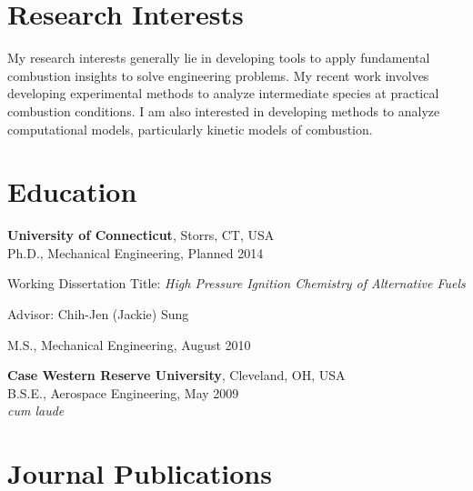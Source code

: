 \section{{\sectionfont Research Interests}}

My research interests generally lie in developing tools to apply fundamental
combustion insights to solve engineering problems. My recent work
involves developing experimental methods to analyze intermediate species
at practical combustion conditions. I am also interested in developing
methods to analyze computational models, particularly kinetic models of
combustion.

\section{{\sectionfont Education}}

\textbf{University of Connecticut}, Storrs, CT, USA\\
Ph.D., Mechanical Engineering, Planned 2014
        \begin{innerlist}
        \item[] Working Dissertation Title: \textit{High Pressure
                Ignition Chemistry of Alternative Fuels}
        \item[] Advisor: Chih-Jen (Jackie) Sung
        \end{innerlist}

\vspace{0.1in}
M.S., Mechanical Engineering, August 2010

\vspace{0.2in}

\textbf{Case Western Reserve University}, Cleveland, OH, USA\\
B.S.E., Aerospace Engineering, May 2009\\
\textit{cum laude}

\section{{\sectionfont Journal Publications}}

